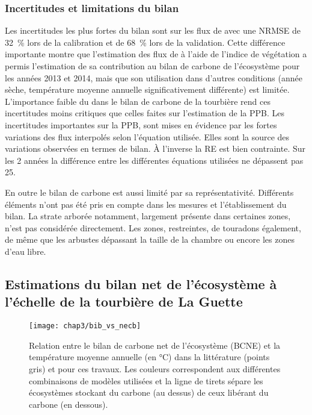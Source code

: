 \subsubsection{Incertitudes et limitations du bilan}
Les incertitudes les plus fortes du bilan sont sur les flux de \chh avec une NRMSE de \SI{32}{\percent} lors de la calibration et de \SI{68}{\percent} lors de la validation.
Cette différence importante montre que l'estimation des flux de \chh à l'aide de l'indice de végétation a permis l'estimation de sa contribution au bilan de carbone de l'écosystème pour les années 2013 et 2014, mais que son utilisation dans d'autres conditions (année sèche, température moyenne annuelle significativement différente) est limitée.
L'importance faible du \chh dans le bilan de carbone de la tourbière rend ces incertitudes moins critiques que celles faites sur l'estimation de la PPB.
Les incertitudes importantes sur la PPB, sont mises en évidence par les fortes variations des flux interpolés selon l'équation utilisée.
Elles sont la source des variations observées en termes de bilan.
À l'inverse la RE est bien contrainte.
Sur les 2 années la différence entre les différentes équations utilisées ne dépassent pas \SI{25}{\gcma}.

En outre le bilan de carbone est aussi limité par sa représentativité. 
Différents éléments n'ont pas été pris en compte dans les mesures et l'établissement du bilan.
La strate arborée notamment, largement présente dans certaines zones, n'est pas considérée directement.
Les zones, restreintes, de touradons également, de même que les arbustes dépassant la taille de la chambre ou encore les zones d'eau libre.

\subsection{Estimations du bilan net de l'écosystème à l'échelle de la tourbière de La Guette}

\begin{figure}
\centering
\texttt{[image: chap3/bib\_vs\_necb]}
\caption{Relation entre le bilan de carbone net de l'écosystème (BCNE) et la température moyenne annuelle (en °C) dans la littérature (points gris) et pour ces travaux.  Les couleurs correspondent aux différentes combinaisons de modèles utilisées et la ligne de tirets sépare les écosystèmes stockant du carbone (au dessus) de ceux libérant du carbone (en dessous).}
\label{fig:bib_vs_necb}
\end{figure}

